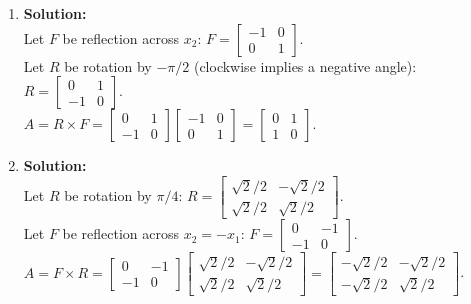 \documentclass[12pt]{article}
\begin{document}
\begin{enumerate}
    \item \textbf{Solution:}\\
    Let $F$ be reflection across $x_2$: $F = \begin{bmatrix} -1 & 0 \\ 0 & 1 \end{bmatrix}$. \\
    Let $R$ be rotation by $-\pi/2$ (clockwise implies a negative angle): $R = \begin{bmatrix} 0 & 1 \\ -1 & 0 \end{bmatrix}$. \\
    $A = R \times F = \begin{bmatrix} 0 & 1 \\ -1 & 0 \end{bmatrix} \begin{bmatrix} -1 & 0 \\ 0 & 1 \end{bmatrix} = \begin{bmatrix} 0 & 1 \\ 1 & 0 \end{bmatrix}$.

    \item \textbf{Solution:}\\
    Let $R$ be rotation by $\pi/4$: $R = \begin{bmatrix} \sqrt{2}/2 & -\sqrt{2}/2 \\ \sqrt{2}/2 & \sqrt{2}/2 \end{bmatrix}$. \\
    Let $F$ be reflection across $x_2 = -x_1$: $F = \begin{bmatrix} 0 & -1 \\ -1 & 0 \end{bmatrix}$. \\
    $A = F \times R = \begin{bmatrix} 0 & -1 \\ -1 & 0 \end{bmatrix} \begin{bmatrix} \sqrt{2}/2 & -\sqrt{2}/2 \\ \sqrt{2}/2 & \sqrt{2}/2 \end{bmatrix} = \begin{bmatrix} -\sqrt{2}/2 & -\sqrt{2}/2 \\ -\sqrt{2}/2 & \sqrt{2}/2 \end{bmatrix}$.


\end{enumerate}
\end{document}
